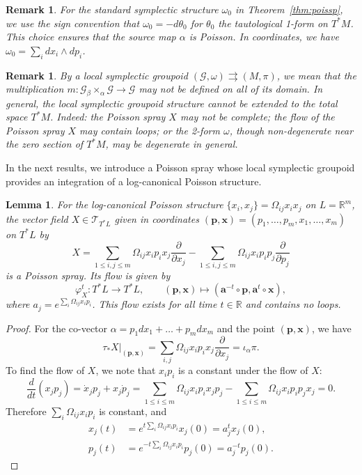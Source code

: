 \documentclass{amsart}
\newtheorem{lemma}[theorem]{Lemma}
\newtheorem{remark}[theorem]{Remark}
\numberwithin{equation}{section}
\newcommand{\bfa}{{\boldsymbol{a}}}
\newcommand{\bfp}{{\boldsymbol{p}}}
\newcommand{\bfx}{{\boldsymbol{x}}}
\newcommand{\cG}{\mathcal{G}}
\newcommand{\cT}{\mathcal{T}}
\newcommand{\RR}{\mathbb{R}}
\newcommand{\rra}{\rightrightarrows}
\begin{document}
\begin{remark}
  For the standard symplectic structure $\omega_0$ in Theorem~\ref{thm:poissp}, we use the sign convention that $\omega_0 = - d \theta_0$ for $\theta_0$ the tautological 1-form on $T^*M$.
  This choice ensures that the source map $\alpha$ is Poisson.
  In coordinates, we have $\omega_0 = \sum_i d x_i \wedge d p_i$.
\end{remark}

\begin{remark}
  By a local symplectic groupoid $(\cG, \omega) \rra (M, \pi)$, we mean that the multiplication $m: \cG {_\beta \times_\alpha} \cG \to \cG$ may not be defined on all of its domain.
  In general, the local symplectic groupoid structure cannot be extended to the total space $T^*M$.
  Indeed: the Poisson spray $X$ may not be complete; the flow of the Poisson spray $X$ may contain loops; or the 2-form $\omega$, though non-degenerate near the zero section of $T^*M$, may be degenerate in general.
\end{remark}

In the next results, we introduce a Poisson spray whose local symplectic groupoid provides an integration of a log-canonical Poisson structure.
\begin{lemma}
  For the log-canonical Poisson structure $\{x_i, x_j\} = \Omega_{ij} x_i x_j$ on $L = \RR^m$, the vector field $X \in \cT_{T^*L}$ given in coordinates $(\bfp, \bfx) = (p_1, \ldots, p_m, x_1, \ldots, x_m)$ on $T^*L$ by
  \begin{equation} 
    \label{eq: PoisSp}
    X = \sum_{1 \leq i,j \leq m}\Omega_{ij}x_i p_i x_j\frac{\partial}{\partial x_j} - \sum_{1 \leq i,j \leq m}\Omega_{ij}x_ip_i p_j\frac{\partial}{\partial p_j}
  \end{equation}
  is a Poisson spray.
  Its flow is given by
  \[\varphi_X^t: T^*L \to T^*L, \qquad (\bfp, \bfx) \mapsto (\bfa^{-t} \circ \bfp, \bfa^t \circ \bfx),\]
  where $a_j = e^{\sum_i \Omega_{ij} x_ip_i}$.
  This flow exists for all time $t \in \RR$ and contains no loops.
\end{lemma}

\begin{proof}
  For the co-vector $\alpha = p_1 dx_1 + \ldots + p_m dx_m$ and the point $(\bfp, \bfx)$, we have
  \[\tau_* X|_{(\bfp,\bfx)} = \sum_{i, j}\Omega_{ij} x_i p_i x_j \frac{\partial}{\partial x_j} = \iota_\alpha \pi.\]
  To find the flow of $X$, we note that $x_i p_i$ is a constant under the flow of $X$:
  \[\frac{d}{dt}(x_j p_j) = \dot{x}_j p_j + x_j \dot{p}_j = \sum_{1 \leq i \leq m}\Omega_{ij}x_i p_i x_j p_j - \sum_{1 \leq i \leq m}\Omega_{ij}x_ip_i p_j x_j = 0.\]
  Therefore $\sum_{i}\Omega_{ij}x_i p_i$ is constant, and
  \begin{align*}
    x_j(t) & = e^{t \sum_i \Omega_{ij} x_ip_i} x_j(0) = a_j^t x_j(0), \\
    p_j(t) & = e^{-t \sum_i \Omega_{ij} x_ip_i} p_j(0) = a_j^{-t} p_j(0).
  \end{align*}
\end{proof}
\end{document}
